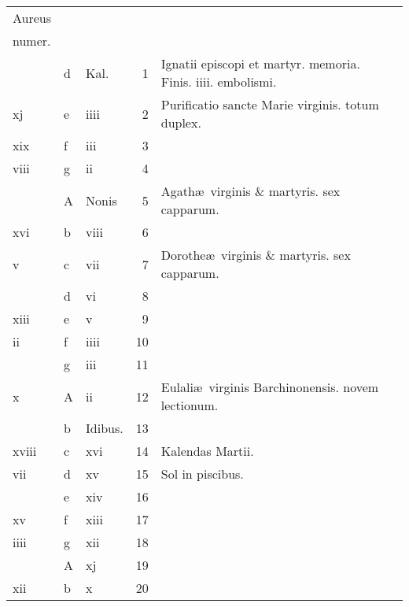 \documentclass[openany]{book}
\begin{document}
\begin{center}
\begin{tabular}{l | l | l | r | l r}
\color{Red}Aureus & & & & \color{Red} \\
\color{Red}numer. & & & & \color{Red} \\
 & d & \color{Red} Kal. & 1 & \color{Red} Ignatii episcopi et martyr. memoria. \quad Finis. iiii. embolismi. \\
\color{Red} xj & e & \color{Red} iiii & 2 & Purificatio sancte Marie virginis. totum duplex. \\
\color{Red} xix & f & \color{Red} iii & 3 & & \color{Red} \\
\color{Red} viii & g & \color{Red} ii & 4 & & \color{Red} \\
 & \color{Red} A & Nonis & 5 & Agath\ae \ virginis \& martyris. \color{Red} sex capparum. & \color{Red} \\
\color{Red} xvi & b & \color{Red} viii & 6 & & \color{Red} \\
\color{Red} v & c & \color{Red} vii & 7 & Dorothe\ae \ virginis \& martyris. \color{Red} sex capparum. & \color{Red} \\
\color{Red}  & d & \color{Red} vi & 8 & & \color{Red} \\
\color{Red} xiii & e & \color{Red} v & 9 & & \color{Red} \\
\color{Red} ii & f & \color{Red} iiii & 10 & & \color{Red} \\
\color{Red}  & g & \color{Red} iii & 11 & & \color{Red} \\
\color{Red} x & \color{Red} A & \color{Red} ii & 12 & Eulali\ae \ virginis Barchinonensis. \color{Red} novem lectionum. & \color{Red} \\
\color{Red}  & b & Idibus. & 13 & & \color{Red} \\
\color{Red} xviii & c & \color{Red} xvi & 14 & \quad \color{Red} Kalendas Martii. & \color{Red} \\
\color{Red} vii & d & \color{Red} xv & 15 & \qquad \color{Red} Sol in piscibus. & \color{Red} \\
\color{Red}  & e & \color{Red} xiv & 16 & & \color{Red} \\
\color{Red} xv & f & \color{Red} xiii & 17 & & \color{Red} \\
\color{Red} iiii & g & \color{Red} xii & 18 & & \color{Red} \\
\color{Red}  & \color{Red} A & \color{Red} xj & 19 & & \color{Red} \\
\color{Red} xii & b & \color{Red} x & 20 & & \color{Red} \\

\end{tabular}
\end{center}
\end{document}
